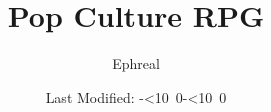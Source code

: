 \def\mytoday{\leavevmode\hbox{\the\year-\twodigits\month-\twodigits\day}}
\def\twodigits#1{\ifnum#1<10 0\fi\the#1}

\title{Pop Culture RPG}
\author{Ephreal}
\date{Last Modified: \mytoday}
\maketitle
\tableofcontents
